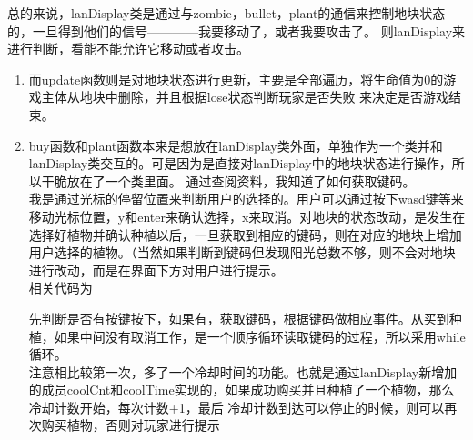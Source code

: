 \documentclass[12pt,a4paper,UTF8]{article}
\begin{document}
    总的来说，lanDisplay类是通过与zombie，bullet，plant的通信来控制地块状态的，一旦得到他们的信号————我要移动了，或者我要攻击了。
    则lanDisplay来进行判断，看能不能允许它移动或者攻击。
    \begin{enumerate}
      \item 而update函数则是对地块状态进行更新，主要是全部遍历，将生命值为0的游戏主体从地块中删除，并且根据lose状态判断玩家是否失败
      来决定是否游戏结束。
      \item buy函数和plant函数本来是想放在lanDisplay类外面，单独作为一个类并和lanDisplay类交互的。可是因为是直接对lanDisplay中的地块状态进行操作，所以干脆放在了一个类里面。
      通过查阅资料，我知道了如何获取键码。\\
      我是通过光标的停留位置来判断用户的选择的。用户可以通过按下wasd键等来移动光标位置，y和enter来确认选择，x来取消。对地块的状态改动，是发生在
      选择好植物并确认种植以后，一旦获取到相应的键码，则在对应的地块上增加用户选择的植物。（当然如果判断到键码但发现阳光总数不够，则不会对地块进行改动，而是在界面下方对用户进行提示。\\
      相关代码为
      
      先判断是否有按键按下，如果有，获取键码，根据键码做相应事件。从买到种植，如果中间没有取消工作，是一个顺序循环读取键码的过程，所以采用while循环。\\
      注意相比较第一次，多了一个冷却时间的功能。也就是通过lanDisplay新增加的成员coolCnt和coolTime实现的，如果成功购买并且种植了一个植物，那么冷却计数开始，每次计数+1，最后
      冷却计数到达可以停止的时候，则可以再次购买植物，否则对玩家进行提示
    \end{enumerate}

  
    
\end{document}

